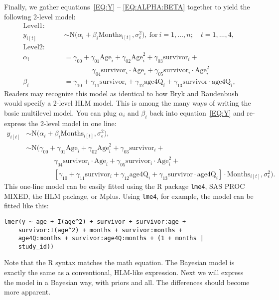\documentclass{article}
\begin{document}
Finally, we gather
equations~\eqref{EQ:Y} -- \eqref{EQ:ALPHA:BETA} together to yield
the following 2-level model:
\begin{equation}
\begin{aligned}
\mathrm{Level 1:} \phantom{2cm} & \\
  y_{i[t]} &\sim \mathrm{N}\bigl(\alpha_{i} + 
        \beta_{i} \mathrm{Months}_{i[t]}, \sigma^2_{\epsilon}\bigr),\ 
    \mathrm{for}\ i = 1, \dots, n;\quad  t = 1, \dots, 4,
    \\
\mathrm{Level 2:} \phantom{2cm} & \\
        \alpha_i &=
        \gamma_{00} +
        \gamma_{01} \mathrm{Age}_i + 
        \gamma_{02} \mathrm{Age}^2_i + 
        \gamma_{03} \mathrm{survivor}_i + \\
        & \qquad \qquad 
        \gamma_{04} \mathrm{survivor}_i\cdot \mathrm{Age}_i+ 
        \gamma_{05} \mathrm{survivor}_i\cdot \mathrm{Age}^2_i 
        \\ 
        \beta_i &= 
        \gamma_{10} + \gamma_{11} \mathrm{survivor}_i + 
        \gamma_{12} \mathrm{age4Q}_i + %
        \gamma_{13} \mathrm{survivor}\cdot
	\mathrm{age4Q}_i,
	\label{EQ:HLM}
\end{aligned}
\end{equation}
Readers may recognize this model as identical to how
Bryk and Raudenbush would specify a 2-level HLM model.
This is among the many ways of writing the basic
multilevel model.  You can plug $\alpha_i$ and $\beta_i$
back into equation~\eqref{EQ:Y} and re-express the
2-level model in one line:
$$
\begin{aligned}
  y_{i[t]} &\sim \mathrm{N}\bigl(\alpha_{i} + 
        \beta_{i} \mathrm{Months}_{i[t]},
	\sigma^2_{\epsilon}\bigr), \\
  &\sim \mathrm{N}\bigl(
        \gamma_{00} +
        \gamma_{01} \mathrm{Age}_i + 
        \gamma_{02} \mathrm{Age}^2_i + 
        \gamma_{03} \mathrm{survivor}_i + \\
        & \qquad \qquad 
        \gamma_{04} \mathrm{survivor}_i\cdot \mathrm{Age}_i+ 
        \gamma_{05} \mathrm{survivor}_i\cdot
	\mathrm{Age}^2_i + \\
	& \qquad \qquad [
        \gamma_{10} + \gamma_{11} \mathrm{survivor}_i + 
        \gamma_{12} \mathrm{age4Q}_i + %
        \gamma_{13} \mathrm{survivor}\cdot
	\mathrm{age4Q}_i
	] \cdot
        \mathrm{Months}_{i[t]},
	  \sigma^2_{\epsilon} \bigr).
\end{aligned}
$$
This one-line model can be easily fitted using the R
package \texttt{lme4}, SAS PROC MIXED, the HLM package,
or Mplus.  Using \texttt{lme4}, for example, the model
can be fitted like this:
\begin{verbatim}
lmer(y ~ age + I(age^2) + survivor + survivor:age +
    survivor:I(age^2) + months + survivor:months +
    age4Q:months + survivor:age4Q:months + (1 + months |
    study_id))
\end{verbatim}
Note that the R syntax matches the math equation.
The Bayesian
model is exactly the same as a conventional, HLM-like
expression.   Next we will express the model in a Bayesian
way, with priors and all.  The differences
should become more apparent. 
\end{document}
